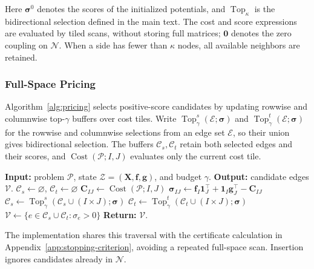 Here $\boldsymbol\sigma^0$ denotes the scores of the initialized potentials, and $\operatorname{Top}_{\kappa}$ is the bidirectional selection defined in the main text.
The cost and score expressions are evaluated by tiled scans, without storing full matrices; $\mathbf0$ denotes the zero coupling on $\mathcal N$.
When a side has fewer than $\kappa$ nodes, all available neighbors are retained.


\subsubsection{Full-Space Pricing}
\label{app:hierarchy-pricing}

Algorithm~\ref{alg:pricing} selects positive-score candidates by updating rowwise and columnwise top-$\gamma$ buffers over cost tiles.
Write $\operatorname{Top}^{s}_{\gamma}(\mathcal E;\boldsymbol\sigma)$ and $\operatorname{Top}^{t}_{\gamma}(\mathcal E;\boldsymbol\sigma)$ for the rowwise and columnwise selections from an edge set $\mathcal E$, so their union gives bidirectional selection.
The buffers $\mathcal C_s,\mathcal C_t$ retain both selected edges and their scores, and $\operatorname{Cost}(\mathcal P;I,J)$ evaluates only the current cost tile.

\begin{algorithm}[t]
\caption{\pricing: streamed full-space pricing}
\label{alg:pricing}
\begin{algorithmic}[1]
\STATE \textbf{Input:} problem $\mathcal P$, state $\mathcal Z=(\mathbf X,\mathbf f,\mathbf g)$, and budget $\gamma$.
\STATE \textbf{Output:} candidate edges $\mathcal V$.
\STATE $\mathcal C_s\gets\varnothing$, $\mathcal C_t\gets\varnothing$
    \STATE $\mathbf C_{IJ}\gets\operatorname{Cost}(\mathcal P;I,J)$
    \STATE $\boldsymbol\sigma_{IJ}\gets\mathbf f_I\mathbf1_J^\top+\mathbf1_I\mathbf g_J^\top-\mathbf C_{IJ}$
    \STATE $\mathcal C_s\gets\operatorname{Top}^{s}_{\gamma}(\mathcal C_s\cup(I\times J);\boldsymbol\sigma)$
    \STATE $\mathcal C_t\gets\operatorname{Top}^{t}_{\gamma}(\mathcal C_t\cup(I\times J);\boldsymbol\sigma)$
\ENDFOR
\STATE $\mathcal V\gets\{e\in\mathcal C_s\cup\mathcal C_t:\sigma_e>0\}$
\STATE \textbf{Return:} $\mathcal V$.
\end{algorithmic}
\end{algorithm}

The implementation shares this traversal with the \kkt certificate calculation in Appendix~\ref{app:stopping-criterion}, avoiding a repeated full-space scan.
Insertion ignores candidates already in $\mathcal N$.

